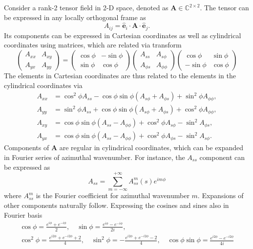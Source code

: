 \documentclass[a4paper, 11pt]{article}
\begin{document}
Consider a rank-2 tensor field in 2-D space, denoted as $\mathbf{A} \in \mathbb{C}^{2\times 2}$. The tensor can be expressed in any locally orthogonal frame as
\[
    A_{ij} = \hat{\mathbf{e}}_i \cdot \mathbf{A} \cdot \hat{\mathbf{e}}_j.
\]
Its components can be expressed in Cartesian coordinates as well as cylindrical coordinates using matrices, which are related via transform
\[
    \begin{pmatrix} A_{xx} & A_{xy} \\ A_{yx} & A_{yy} \end{pmatrix} = 
    \begin{pmatrix} \cos\phi & -\sin\phi \\ \sin\phi & \cos\phi \end{pmatrix}
    \begin{pmatrix} A_{ss} & A_{s\phi} \\ A_{\phi s} & A_{\phi\phi} \end{pmatrix}
    \begin{pmatrix} \cos\phi & \sin\phi \\ -\sin\phi & \cos\phi \end{pmatrix}
\]
The elements in Cartesian coordinates are thus related to the elements in the cylindrical coordinates via
\[
    \begin{aligned}
        A_{xx} &= \cos^2\phi A_{ss} - \cos\phi \sin\phi \left(A_{s\phi} + A_{\phi s}\right) + \sin^2\phi A_{\phi\phi}, \\
        A_{yy} &= \sin^2\phi A_{ss} + \cos\phi \sin\phi \left(A_{s\phi} + A_{\phi s}\right) + \cos^2\phi A_{\phi\phi}, \\
        A_{xy} &= \cos\phi \sin\phi \left(A_{ss} - A_{\phi\phi}\right) + \cos^2\phi A_{s\phi} - \sin^2 A_{\phi s}, \\
        A_{yx} &= \cos\phi \sin\phi \left(A_{ss} - A_{\phi\phi}\right) + \cos^2\phi A_{\phi s} - \sin^2 A_{s \phi}.
    \end{aligned}
\]
Components of $\mathbf{A}$ are regular in cylindrical coordinates, which can be expanded in Fourier series of azimuthal wavenumber. For instance, the $A_{ss}$ component can be expressed as
\[
    A_{ss} = \sum_{m=-\infty}^{+\infty} A_{ss}^m(s) e^{im\phi}
\]
where $A_{ss}^m$ is the Fourier coefficient for azimuthal wavenumber $m$. Expansions of other components naturally follow. Expressing the cosines and sines also in Fourier basis
\[
\begin{gathered}
    \cos\phi = \frac{e^{i\phi} + e^{-i\phi}}{2},\quad \sin\phi = \frac{e^{i\phi} - e^{-i\phi}}{2i},\\
    \cos^2\phi = \frac{e^{i2\phi} + e^{-i2\phi} + 2}{4},\quad \sin^2\phi = -\frac{e^{i2\phi} + e^{-i2\phi} - 2}{4},\quad \cos\phi \sin\phi = \frac{e^{i2\phi} - e^{-i2\phi}}{4i}
\end{gathered}
\]
\end{document}
